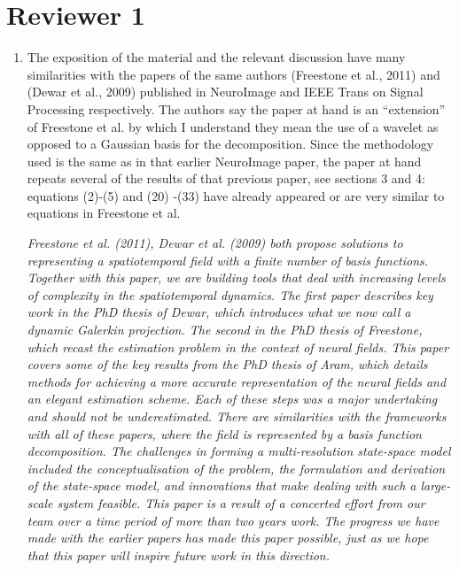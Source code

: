 \documentclass{article}
\begin{document}
\begin{enumerate}
\end{enumerate}

    \section{Reviewer 1}
    

    \begin{enumerate}
        \item The exposition of the material and the relevant discussion have many similarities with the papers of the same authors (Freestone et al., 2011) and (Dewar et al., 2009) published in NeuroImage and IEEE Trans on Signal Processing  respectively. The authors say the paper at hand is an ``extension'' of Freestone et al. by which I understand they mean the use of a wavelet as opposed to a Gaussian basis for the decomposition. Since the methodology used is the same as in that earlier NeuroImage paper, the paper at hand repeats several of  the results of that previous paper, see sections 3 and 4: equations (2)-(5) and (20) -(33) have already appeared or are very similar to equations in Freestone et al.   
								 
	\emph{Freestone et al. (2011), Dewar et al. (2009) both propose solutions to representing a spatiotemporal field with a finite number of basis functions. Together with this paper, we are building tools that deal with increasing levels of complexity in the spatiotemporal dynamics. The first paper describes key work in the PhD thesis of Dewar, which introduces what we now call a dynamic Galerkin projection. The second in the PhD thesis of Freestone, which recast the estimation problem in the context of neural fields. This paper covers some of the key results from the PhD thesis of Aram, which details methods for achieving a more accurate representation of the neural fields and an elegant estimation scheme. Each of these steps was a major undertaking and should not be underestimated. There are similarities with the frameworks with all of these papers, where the field is represented by a basis function decomposition. The challenges in forming a multi-resolution state-space model included the conceptualisation of the problem, the formulation and derivation of the state-space model, and innovations that make dealing with such a large-scale system feasible. This paper is a result of a concerted effort from our team over a time period of more than two years work. The progress we have made with the earlier papers has made this paper possible, just as we hope that this paper will inspire future work in this direction.}
	        

\end{enumerate}
\end{document}
